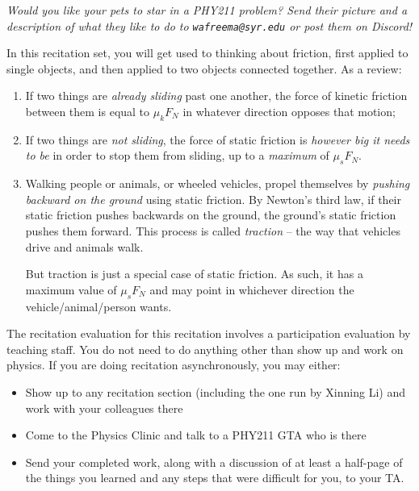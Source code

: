 \documentclass[12pt]{article}
\newcommand{\BI}{\begin{itemize}}
\newcommand{\EI}{\end{itemize}}
\newcommand{\BS}{\bigskip}
\begin{document}
\Large
\centerline{}
\normalsize
\centerline{}

\begin{center}
{\it Would you like your pets to star in a PHY211 problem? Send their picture and a description of what they like to do to {\tt wafreema@syr.edu} or post them on Discord!}
\end{center}

In this recitation set, you will get used to thinking about friction, first applied to single objects, and then applied to two objects connected together. As a review:


\begin{enumerate}
	\item If two things are {\it already sliding} past one another, the force of kinetic friction between them is equal to $\mu_k F_N$ in whatever direction opposes that motion;
	\item If two things are {\it not sliding}, the force of static friction is {\it however big it needs to be} in order to stop
	them from sliding, up to a {\it maximum} of $\mu_s F_N$.
	\item Walking people or animals, or wheeled vehicles, propel themselves by {\it pushing backward on the ground} using static friction. By Newton's third law, if their static friction pushes backwards on the ground, the ground's static friction pushes them forward. This process is called {\it traction} -- the way that vehicles drive and animals walk.
	
	But traction is just a special case of static friction. As such, it has a maximum value of $\mu_s F_N$ and may point in whichever direction the vehicle/animal/person wants.
\end{enumerate}

\BS

The recitation evaluation for this recitation involves a participation evaluation by teaching staff. You do not need to do anything other than show up and work on physics. If you are doing recitation asynchronously, you may either:

\BI
\item Show up to any recitation section (including the one run by Xinning Li) and work with your colleagues there
\item Come to the Physics Clinic and talk to a PHY211 GTA who is there 
\item Send your completed work, along with a discussion of at least a half-page of the things you learned and any steps that were difficult for you, to your TA.
\EI
\end{document}
